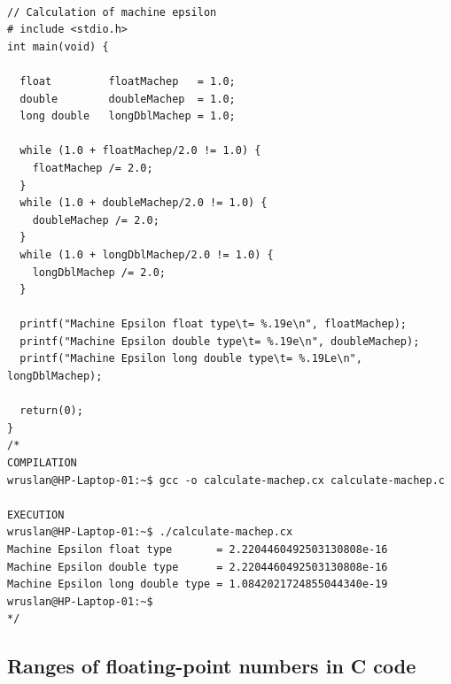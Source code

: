 \begin{lstlisting}[caption={Calculation of machine epsilon C code}, label=lst-Calculation of machine epsilon C code]	

// Calculation of machine epsilon
# include <stdio.h>
int main(void) {
	
  float         floatMachep   = 1.0;
  double        doubleMachep  = 1.0;
  long double   longDblMachep = 1.0;
	
  while (1.0 + floatMachep/2.0 != 1.0) {
	floatMachep /= 2.0;
  }
  while (1.0 + doubleMachep/2.0 != 1.0) {
	doubleMachep /= 2.0;
  }
  while (1.0 + longDblMachep/2.0 != 1.0) {
	longDblMachep /= 2.0;
  }

  printf("Machine Epsilon float type\t= %.19e\n", floatMachep);
  printf("Machine Epsilon double type\t= %.19e\n", doubleMachep);
  printf("Machine Epsilon long double type\t= %.19Le\n", longDblMachep);
	
  return(0);
}
/*
COMPILATION  
wruslan@HP-Laptop-01:~$ gcc -o calculate-machep.cx calculate-machep.c 

EXECUTION
wruslan@HP-Laptop-01:~$ ./calculate-machep.cx 
Machine Epsilon float type       = 2.2204460492503130808e-16 
Machine Epsilon double type      = 2.2204460492503130808e-16 
Machine Epsilon long double type = 1.0842021724855044340e-19 
wruslan@HP-Laptop-01:~$ 
*/
\end{lstlisting}

\clearpage
\pagebreak

\subsection{Ranges of floating-point numbers in C code}
\label{app4-Ranges of floating-point numbers in C code}

